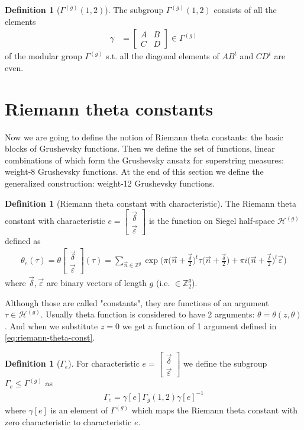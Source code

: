 \documentclass{article}
\newcommand{\ZZ}{\mathbb{Z}}
\newcommand{\ch}[2]{\left[\begin{array}{c}#1\\ #2 \end{array}\right]}
\newcommand{\de}{\delta}
\newcommand{\ep}{\varepsilon}
\theoremstyle{plain}
\theoremstyle{definition}
\newtheorem{definition}[theorem]{Definition}
\begin{document}
\begin{definition}[$\Gamma^{(g)}(1,2)$]
    The subgroup $\Gamma^{(g)}(1,2)$ consists of all the elements 
    \begin{align}
        \gamma &= \begin{bmatrix}A & B \\ C & D\end{bmatrix} \in \Gamma^{(g)}
    \end{align}
    of the modular group $\Gamma^{(g)}$ s.t. all the diagonal elements 
    of $AB^t$ and $CD^t$ are even.
\end{definition}

\section{Riemann theta constants} \label{sec:riemann-theta-constants}
Now we are going to define 
the notion of Riemann theta constants: the basic blocks of Grushevsky functions.
Then we define the set of functions, linear combinations of which form the Grushevsky ansatz for 
superstring measures: weight-8 Grushevsky functions.
At the end of this section we define the generalized construction: 
weight-12 Grushevsky functions.
\begin{definition}[Riemann theta constant with characteristic]
    The Riemann theta constant with characteristic $e=\ch {{\vec{\de}}}{{\vec{\ep}}}$ 
    is the function on Siegel half-space $\mathcal{H}^{(g)}$ defined as
    \begin{align}\label{eq:riemann-theta-const}
        \theta_e(\tau)=
        \theta \ch{{\vec{\de}}}{{\vec{\ep}}} (\tau) =
        \sum_{\vec n \in \mathbb{Z}^g} 
            \exp {
                \Big(
                    \pi \big(\vec n + \frac{{\vec{\de}}}{2}\big)^t \tau \big(\vec n + \frac{{\vec{\de}}}{2}\big) + 
                    \pi i \big(\vec n + \frac{{\vec{\de}}}{2}\big)^t {\vec{\ep}}
                \Big)
            }
    \end{align}
    where ${\vec{\de}}, {\vec{\ep}}$ are binary vectors of length $g$ (i.e. $\in \ZZ_2^g$).
\end{definition}

Although those are called "constants", they are functions of an argument 
$\tau \in \mathcal{H}^{(g)}$. 
Usually theta function is considered to have 2 arguments: $\theta=\theta(z, \theta)$. And
when we substitute $z=0$ we get a function of 1 argument defined in \eqref{eq:riemann-theta-const}.


\begin{definition}[$\Gamma_e$]
    For characteristic $e=\ch{{\vec{\de}}}{{\vec{\ep}}}$ we define the subgroup $\Gamma_e \leq \Gamma^{(g)}$ as 
    \begin{align}
        \Gamma_e = \gamma[e] \Gamma_g(1, 2) \gamma[e]^{-1}
    \end{align}
    where $\gamma[e]$ is an element of $\Gamma^{(g)}$ which maps the Riemann theta constant 
    with zero characteristic to characteristic $e$.
\end{definition}
\end{document}
